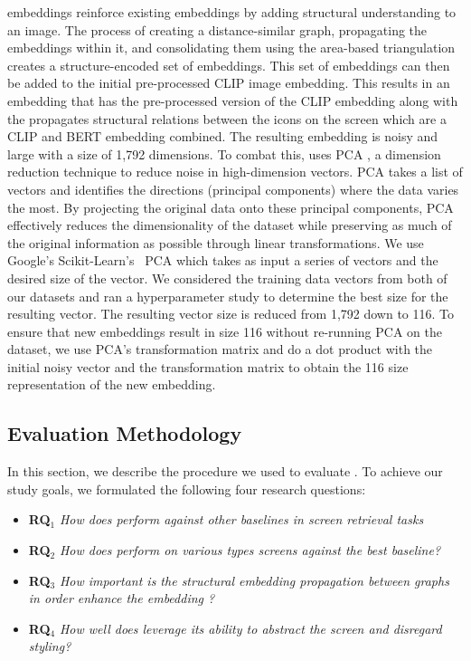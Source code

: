 \FRAME embeddings reinforce existing embeddings by adding structural understanding to an image. The process of creating a distance-similar graph, propagating the embeddings within it, and consolidating them using the area-based triangulation creates a structure-encoded set of embeddings. This set of embeddings can then be added to the initial pre-processed CLIP image embedding. This results in an embedding that has the pre-processed version of the CLIP embedding along with the propagates structural relations between the icons on the screen which are a CLIP and BERT embedding combined. The resulting embedding is noisy and large with a size of 1,792 dimensions. To combat this, \FRAME uses PCA \cite{PCA}, a dimension reduction technique to reduce noise in high-dimension vectors. PCA takes a list of vectors and identifies the directions (principal components) where the data varies the most. By projecting the original data onto these principal components, PCA effectively reduces the dimensionality of the dataset while preserving as much of the original information as possible through linear transformations. We use Google's Scikit-Learn's~\cite{sklearn} PCA which takes as input a series of vectors and the desired size of the vector. We considered the training data vectors from both of our datasets and ran a hyperparameter study to determine the best size for the resulting vector. The resulting vector size is reduced from 1,792 down to 116. To ensure that new embeddings result in size 116 without re-running PCA on the dataset, we use PCA's transformation matrix and do a dot product with the initial noisy vector and the transformation matrix to obtain the 116 size representation of the new embedding. 

\subsection{Evaluation Methodology}

In this section, we describe the procedure we used to evaluate \FRAME. To achieve our study goals, we formulated the following
four research questions:

\begin{itemize}
	\item{\textbf{RQ$_1$} \textit{How does \FRAME perform against other baselines in screen retrieval tasks}}
	\item{\textbf{RQ$_2$} \textit{How does \FRAME perform on various types screens against the best baseline?}}
        \item{\textbf{RQ$_3$} \textit{How important is the structural embedding propagation between graphs in order enhance the embedding ?}}
        \item{\textbf{RQ$_4$} \textit{How well does \FRAME leverage its ability to abstract the screen and disregard styling?}}
        
\end{itemize}

